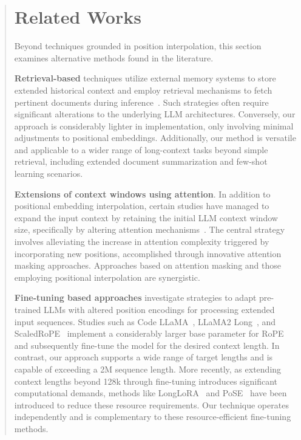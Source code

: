 \begin{abstract}
\section{Related Works}

Beyond techniques grounded in position interpolation, this section examines alternative methods found in the literature.

\textbf{Retrieval-based} techniques utilize external memory systems to store extended historical context and employ retrieval mechanisms to fetch pertinent documents during inference~\cite{longllama,wang2023augmenting,borgeaud2022improving}. Such strategies often require significant alterations to the underlying LLM architectures. Conversely, our approach is considerably lighter in implementation, only involving minimal adjustments to positional embeddings. Additionally, our method is versatile and applicable to a wider range of long-context tasks beyond simple retrieval, including extended document summarization and few-shot learning scenarios.

\textbf{Extensions of context windows using attention}. In addition to positional embedding interpolation, certain studies have managed to expand the input context by retaining the initial LLM context window size, specifically by altering attention mechanisms~\cite{han2023lminfinite, streamingllm,parallelwindow}. The central strategy involves alleviating the increase in attention complexity triggered by incorporating new positions, accomplished through innovative attention masking approaches. Approaches based on attention masking and those employing positional interpolation are synergistic.

\textbf{Fine-tuning based approaches} investigate strategies to adapt pre-trained LLMs with altered position encodings for processing extended input sequences. Studies such as Code LLaMA~\cite{codellama}, LLaMA2 Long~\cite{xiong2023effective}, and ScaledRoPE~\cite{liu2023scaling} implement a considerably larger base parameter for RoPE and subsequently fine-tune the model for the desired context length. In contrast, our approach supports a wide range of target lengths and is capable of exceeding a 2M sequence length. More recently, as extending context lengths beyond 128k through fine-tuning introduces significant computational demands, methods like LongLoRA~\cite{longlora} and PoSE~\cite{zhu2023pose} have been introduced to reduce these resource requirements. Our technique operates independently and is complementary to these resource-efficient fine-tuning methods.


\end{abstract}
